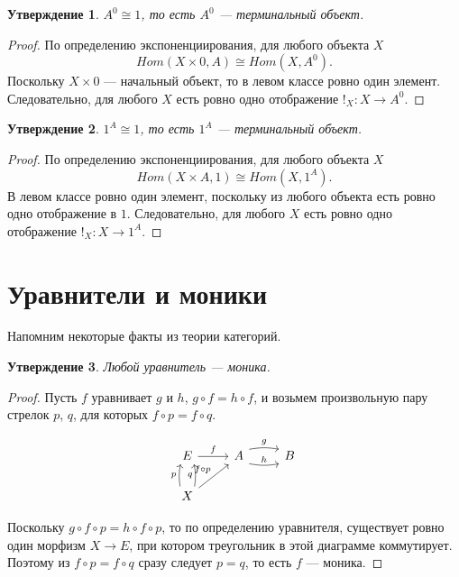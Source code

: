 \documentclass[a4paper, 12pt]{article}
\newtheorem{exercise}{Утверждение}
\begin{document}
\begin{exercise}
$A^0\cong 1$, то есть $A^0$ --- терминальный объект.
\end{exercise}
\begin{proof}
По определению экспоненциирования, для любого объекта $X$
  $$Hom(X\times 0, A) \cong Hom(X, A^0).$$
Поскольку $X\times 0$ --- начальный объект, то в левом классе ровно один элемент. Следовательно, для любого $X$ есть ровно одно отображение $!_X\colon X\to A^0$. 
\end{proof}

\begin{exercise}
$1^A\cong 1$, то есть $1^A$ --- терминальный объект.
\end{exercise}
\begin{proof}
По определению экспоненциирования, для любого объекта $X$
  $$Hom(X\times A, 1) \cong Hom(X, 1^A).$$
В левом классе ровно один элемент, поскольку из любого объекта есть ровно одно отображение в $1$. Следовательно, для любого $X$ есть ровно одно отображение $!_X\colon X\to 1^A$. 
\end{proof}

\pagebreak
\section{Уравнители и моники}

Напомним некоторые факты из теории категорий.

\begin{exercise}
Любой уравнитель --- моника.
\end{exercise}
\begin{proof}
Пусть $f$ уравнивает $g$ и $h$, $g\circ f = h\circ f$, и возьмем произвольную пару стрелок $p$, $q$, для которых
$f\circ p = f\circ q$.

\[
\begin{tikzcd}
E \arrow{r}{f} 
& A \arrow[shift left=1ex, bend left=10]{r}{g} \arrow[shift right=1ex, bend right=10]{r}{h} & B \\
X \arrow[shift left=1ex, bend left=10]{u}{p} \arrow[shift right=1ex, bend right=10]{u}{q} \arrow{ru}{f\circ p}
\end{tikzcd}
\]

Поскольку $g\circ f \circ p = h\circ f \circ p$, то по определению уравнителя, существует ровно один морфизм $X\to E$, при котором треугольник в этой диаграмме коммутирует. Поэтому из $f\circ p = f\circ q$ сразу следует $p = q$, то есть $f$ --- моника.
\end{proof}
\end{document}
